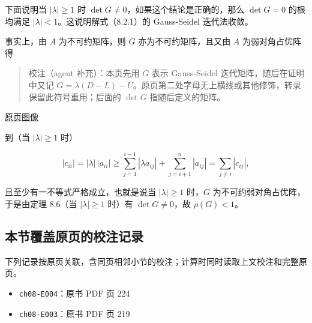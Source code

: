 \documentclass[
  10pt,
  fontset=fandol]{ctexart}
\providecommand{\tightlist}{%
  \setlength{\itemsep}{0pt}\setlength{\parskip}{0pt}}
\begin{document}
下面说明当 \(|\lambda|\geqslant1\) 时 \(\det G\neq0\)，如果这个结论是正确的，那么 \(\det G=0\) 的根均满足 \(|\lambda|<1\)。这说明解式（8.2.1）的 Gauss-Seidel 迭代法收敛。

事实上，由 \(A\) 为不可约矩阵，则 \(G\) 亦为不可约矩阵，且又由 \(A\) 为弱对角占优阵得

\begin{quote}
校注（agent 补充）：本页先用 \(G\) 表示 Gauss-Seidel 迭代矩阵，随后在证明中又记 \(G=\lambda(D-L)-U\)。原页第二处字母无上横线或其他修饰，转录保留此符号重用；后面的 \(\det G\) 指随后定义的矩阵。
\end{quote}

\href{../../source-images/pdf-226.jpeg}{原页图像}

到（当 \(|\lambda|\geqslant1\) 时）

\[
|c_{ii}|=|\lambda|\,|a_{ii}|
\geqslant\sum_{j=1}^{i-1}|\lambda a_{ij}|+\sum_{j=i+1}^n|a_{ij}|
=\sum_{j\neq i}|c_{ij}|,
\]

且至少有一不等式严格成立，也就是说当 \(|\lambda|\geqslant1\) 时，\(G\) 为不可约弱对角占优阵，于是由定理 8.6（当 \(|\lambda|\geqslant1\) 时）有 \(\det G\neq0\)，故 \(\rho(G)<1\)。

\subsection{本节覆盖原页的校注记录}\label{ux672cux8282ux8986ux76d6ux539fux9875ux7684ux6821ux6ce8ux8bb0ux5f55}

下列记录按原页关联，含同页相邻小节的校注；计算时同时读取上文校注和完整原页。

\begin{itemize}
\tightlist
\item
  \texttt{ch08-E004}：原书 PDF 页 224
\item
  \texttt{ch08-E003}：原书 PDF 页 219
\end{itemize}
\end{document}
